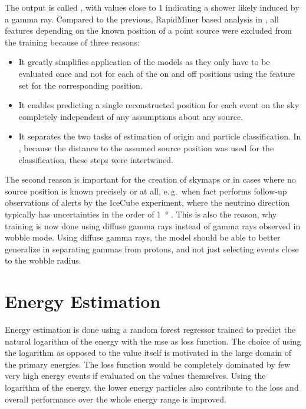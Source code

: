 The output is called , with values close to \num{1} indicating
a shower likely induced by a gamma ray.
Compared to the previous, RapidMiner based analysis in \cite{phd-temme}, all
features depending on the known position of a point source were excluded from 
the training because of three reasons:
\begin{itemize}
  \item It greatly simplifies application of the models as they only have to be evaluated
    once and not for each of the on and off positions using the feature set for the 
    corresponding position.
  \item It enables predicting a single reconstructed position for each event on the sky
    completely independent of any assumptions about any source.
  \item It separates the two tasks of estimation of origin and particle classification.
    In \cite{phd-temme}, because the distance to the assumed source position was used
    for the classification, these steps were intertwined.
\end{itemize}

The second reason is important for the creation of skymaps or in cases where
no source position is known precisely or at all, e.\,g.\ when \gls{fact} performs
follow-up observations of alerts by the IceCube experiment, where the neutrino 
direction typically has uncertainties in the order of \SI{1}{\degree} \cite{icecube-hese}.
This is also the reason, why training is now done using diffuse gamma rays instead
of gamma rays observed in wobble mode.
Using diffuse gamma rays, the model should be able to better generalize in 
separating gammas from protons, and not just selecting events close to the wobble radius.

\section{Energy Estimation}

Energy estimation is done using a random forest regressor trained
to predict the natural logarithm of the energy with the \gls{mse} as loss function.
The choice of using the logarithm as opposed to the value itself is motivated in
the large domain of the primary energies.
The loss function would be completely dominated by few very high energy events
if evaluated on the values themselves.
Using the logarithm of the energy, the lower energy particles also contribute to
the loss and overall performance over the whole energy range is improved.


